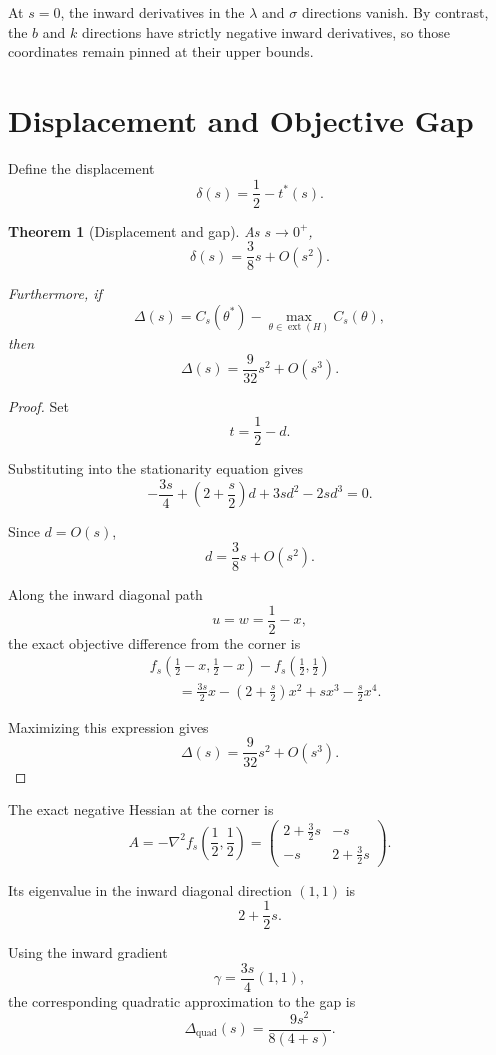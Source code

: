 \documentclass[11pt]{article}
\newtheorem{theorem}{Theorem}[section]
\theoremstyle{remark}
\DeclareMathOperator{\ext}{ext}
\begin{document}
At $s=0$, the inward derivatives in the $\lambda$ and $\sigma$ directions
vanish. By contrast, the $b$ and $k$ directions have strictly negative inward
derivatives, so those coordinates remain pinned at their upper bounds.

\section{Displacement and Objective Gap}

Define the displacement
\[
\delta(s)=\frac12-t^*(s).
\]

\begin{theorem}[Displacement and gap]
As $s\to0^+$,
\[
\delta(s)=\frac38s+O(s^2).
\]

Furthermore, if
\[
\Delta(s)
=
C_s(\theta^*)
-
\max_{\theta\in\ext(H)}C_s(\theta),
\]
then
\[
\Delta(s)
=
\frac{9}{32}s^2+O(s^3).
\]
\end{theorem}

\begin{proof}
Set
\[
t=\frac12-d.
\]

Substituting into the stationarity equation gives
\[
-\frac{3s}{4}
+
\left(2+\frac{s}{2}\right)d
+
3sd^2
-
2sd^3
=0.
\]

Since $d=O(s)$,
\[
d=\frac38s+O(s^2).
\]

Along the inward diagonal path
\[
u=w=\frac12-x,
\]
the exact objective difference from the corner is
\begin{align}
&f_s\left(\frac12-x,\frac12-x\right)
-
f_s\left(\frac12,\frac12\right)
\nonumber\\
&\qquad=
\frac{3s}{2}x
-\left(2+\frac{s}{2}\right)x^2
+sx^3-\frac{s}{2}x^4.
\end{align}

Maximizing this expression gives
\[
\Delta(s)=\frac{9}{32}s^2+O(s^3).
\]
\end{proof}

The exact negative Hessian at the corner is
\[
A=
-\nabla^2 f_s\left(\frac12,\frac12\right)
=
\begin{pmatrix}
2+\frac32s & -s\\
-s & 2+\frac32s
\end{pmatrix}.
\]

Its eigenvalue in the inward diagonal direction $(1,1)$ is
\[
2+\frac12s.
\]

Using the inward gradient
\[
\gamma=\frac{3s}{4}(1,1),
\]
the corresponding quadratic approximation to the gap is
\[
\Delta_{\mathrm{quad}}(s)
=
\frac{9s^2}{8(4+s)}.
\]
\end{document}
